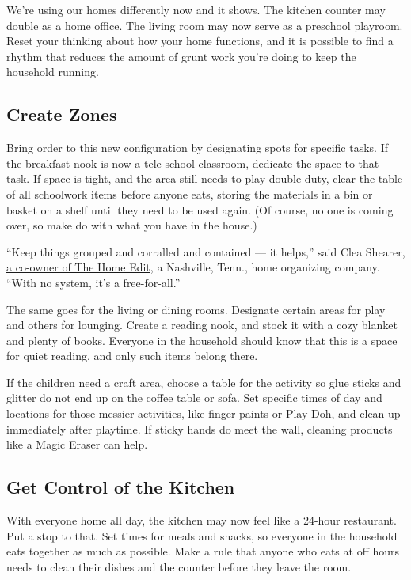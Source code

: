 We're using our homes differently now and it shows. The kitchen counter
may double as a home office. The living room may now serve as a
preschool playroom. Reset your thinking about how your home functions,
and it is possible to find a rhythm that reduces the amount of grunt
work you're doing to keep the household running.

\hypertarget{create-zones}{%
\subsection{Create Zones}\label{create-zones}}

Bring order to this new configuration by designating spots for specific
tasks. If the breakfast nook is now a tele-school classroom, dedicate
the space to that task. If space is tight, and the area still needs to
play double duty, clear the table of all schoolwork items before anyone
eats, storing the materials in a bin or basket on a shelf until they
need to be used again. (Of course, no one is coming over, so make do
with what you have in the house.)

``Keep things grouped and corralled and contained --- it helps,'' said
Clea Shearer, \href{https://thehomeedit.com/story/}{a co-owner of The
Home Edit}, a Nashville, Tenn., home organizing company. ``With no
system, it's a free-for-all.''

The same goes for the living or dining rooms. Designate certain areas
for play and others for lounging. Create a reading nook, and stock it
with a cozy blanket and plenty of books. Everyone in the household
should know that this is a space for quiet reading, and only such items
belong there.

If the children need a craft area, choose a table for the activity so
glue sticks and glitter do not end up on the coffee table or sofa. Set
specific times of day and locations for those messier activities, like
finger paints or Play-Doh, and clean up immediately after playtime. If
sticky hands do meet the wall, cleaning products like a Magic Eraser can
help.

\hypertarget{get-control-of-the-kitchen}{%
\subsection{Get Control of the
Kitchen}\label{get-control-of-the-kitchen}}

With everyone home all day, the kitchen may now feel like a 24-hour
restaurant. Put a stop to that. Set times for meals and snacks, so
everyone in the household eats together as much as possible. Make a rule
that anyone who eats at off hours needs to clean their dishes and the
counter before they leave the room.

